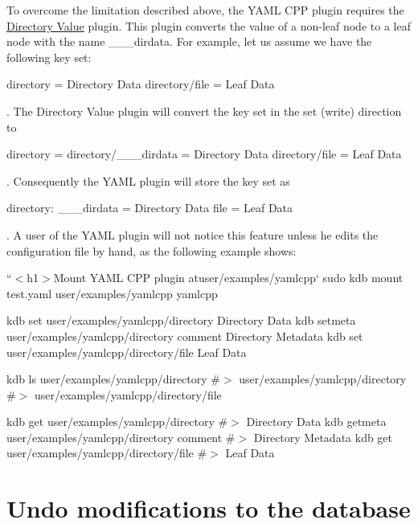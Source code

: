 To overcome the limitation described above, the Y\+A\+ML C\+PP plugin requires the \hyperlink{md_src_plugins_directoryvalue_README_src_plugins_directoryvalue_README_md}{Directory Value} plugin. This plugin converts the value of a non-\/leaf node to a leaf node with the name {\ttfamily \+\_\+\+\_\+\+\_\+dirdata}. For example, let us assume we have the following key set\+:


\begin{DoxyCode}
directory      = Directory Data
directory/file = Leaf Data
\end{DoxyCode}


. The Directory Value plugin will convert the key set in the set (write) direction to


\begin{DoxyCode}
directory            =
directory/\_\_\_dirdata = Directory Data
directory/file       = Leaf Data
\end{DoxyCode}


. Consequently the Y\+A\+ML plugin will store the key set as


\begin{DoxyCode}
directory:
  \_\_\_dirdata = Directory Data
  file       = Leaf Data
\end{DoxyCode}


. A user of the Y\+A\+ML plugin will not notice this feature unless he edits the configuration file by hand, as the following example shows\+:

``{\ttfamily  $<$h1$>$Mount Y\+A\+ML C\+PP plugin at}user/examples/yamlcpp` sudo kdb mount test.\+yaml user/examples/yamlcpp yamlcpp

kdb set user/examples/yamlcpp/directory \textquotesingle{}Directory Data\textquotesingle{} kdb setmeta user/examples/yamlcpp/directory comment \textquotesingle{}Directory Metadata\textquotesingle{} kdb set user/examples/yamlcpp/directory/file \textquotesingle{}Leaf Data\textquotesingle{}

kdb ls user/examples/yamlcpp/directory \#$>$ user/examples/yamlcpp/directory \#$>$ user/examples/yamlcpp/directory/file

kdb get user/examples/yamlcpp/directory \#$>$ Directory Data kdb getmeta user/examples/yamlcpp/directory comment \#$>$ Directory Metadata kdb get user/examples/yamlcpp/directory/file \#$>$ Leaf Data

\section*{Undo modifications to the database}


